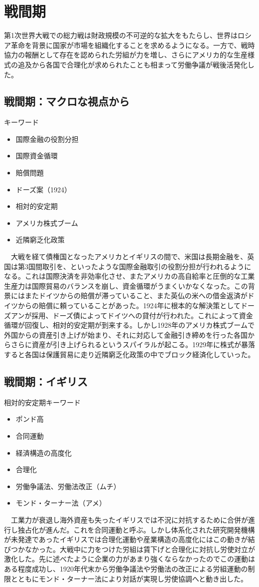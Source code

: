 \documentclass{jsarticle}
\begin{document}
\section{戦間期}
第1次世界大戦での総力戦は財政規模の不可逆的な拡大をもたらし、世界はロシア革命を背景に国家が市場を組織化することを求めるようになる。一方で、戦時協力の報酬として存在を認められた労組が力を増し、さらにアメリカ的な生産様式の追及から各国で合理化が求められたことも相まって労働争議が戦後活発化した。
\subsection{戦間期：マクロな視点から}
キーワード
\begin{itemize}
\item 国際金融の役割分担
\item 国際資金循環
\item 賠償問題
\item ドーズ案（1924）
\item 相対的安定期
\item アメリカ株式ブーム
\item 近隣窮乏化政策
\end{itemize}
　大戦を経て債権国となったアメリカとイギリスの間で、米国は長期金融を、英国は第3国間取引を、といったような国際金融取引の役割分担が行われるようになる。これは国際決済を非効率化させ、またアメリカの高自給率と圧倒的な工業生産力は国際貿易のバランスを崩し、資金循環がうまくいかなくなった。この背景にはまたドイツからの賠償が滞っていること、また英仏の米への借金返済がドイツからの賠償に頼っていることがあった。1924年に根本的な解決策としてドーズアンが採用、ドーズ債によってドイツへの貸付が行われた。これによって資金循環が回復し、相対的安定期が到来する。しかし1928年のアメリカ株式ブームで外国からの資産引き上げが始まり、それに対応して金融引き締めを行った各国からさらに資産が引き上げられるというスパイラルが起こる。1929年に株式が暴落すると各国は保護貿易に走り近隣窮乏化政策の中でブロック経済化していった。

\subsection{戦間期：イギリス}
相対的安定期キーワード
\begin{itemize}
\item ポンド高
\item 合同運動
\item 経済構造の高度化
\item 合理化
\item 労働争議法、労働法改正（ムチ）
\item モンド・ターナー法（アメ）
\end{itemize}
　工業力が衰退し海外資産も失ったイギリスでは不況に対抗するために合併が進行し独占化が進んだ。これを合同運動と呼ぶ。しかし体系化された研究開発機構が未発達であったイギリスでは合理化運動や産業構造の高度化にはこの動きが結びつかなかった。大戦中に力をつけた労組は賃下げと合理化に対抗し労使対立が激化した。先に述べたように企業の力があまり強くならなかったのでこの運動はある程度成功し、1920年代末から労働争議法や労働法の改正による労組運動の制限とともにモンド・ターナー法により対話が実現し労使協調へと動き出した。
\end{document}
